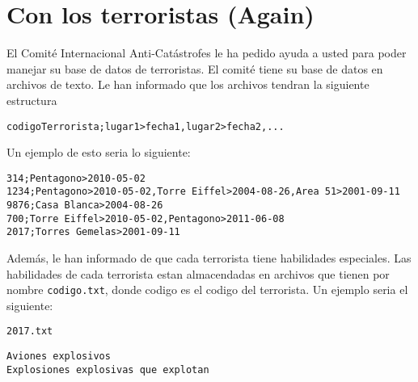 \section{Con los terroristas (Again)}

El Comité Internacional Anti-Catástrofes le ha pedido ayuda a usted para poder manejar su base de datos de terroristas. El comité tiene su base de datos en archivos de texto. Le han informado que los archivos tendran la siguiente estructura

\texttt{codigoTerrorista;lugar1>fecha1,lugar2>fecha2,...}

Un ejemplo de esto seria lo siguiente:

\begin{lstlisting}[style=consola]
314;Pentagono>2010-05-02
1234;Pentagono>2010-05-02,Torre Eiffel>2004-08-26,Area 51>2001-09-11
9876;Casa Blanca>2004-08-26
700;Torre Eiffel>2010-05-02,Pentagono>2011-06-08
2017;Torres Gemelas>2001-09-11
\end{lstlisting}

Además, le han informado de que cada terrorista tiene habilidades especiales. Las habilidades de cada terrorista estan almacendadas en archivos que tienen por nombre \texttt{codigo.txt}, donde codigo es el codigo del terrorista. Un ejemplo seria el siguiente:

\begin{center}
\texttt{2017.txt}
\end{center}
\begin{lstlisting}[style=consola]
Aviones explosivos
Explosiones explosivas que explotan 
\end{lstlisting}

